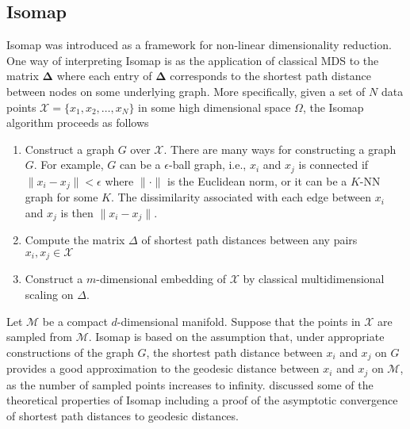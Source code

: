 \subsection{Isomap}
\label{sec:isomap}
Isomap \citep{tenebaum00:_global_geomet_framew_nonlin_dimen_reduc} was
introduced as a framework for non-linear dimensionality reduction. One
way of interpreting Isomap is as the application of classical MDS to
the matrix $\bm{\Delta}$ where each entry of $\bm{\Delta}$ corresponds
to the shortest path distance between nodes on some underlying
graph. More specifically, given a set of $N$ data points $\mathcal{X}
= \{x_1, x_2, \dots, x_N\}$ in some high dimensional space $\Omega$,
the Isomap algorithm proceeds as follows
\begin{enumerate}
\item Construct a graph $G$ over $\mathcal{X}$. There are many ways
  for constructing a graph $G$. For example, $G$ can be a
  $\epsilon$-ball graph, i.e., $x_i$ and $x_j$ is connected if $\|x_i
  - x_j\| < \epsilon$ where $\| \cdot \|$ is the Euclidean norm, or it
  can be a $K$-NN graph for some $K$. The dissimilarity associated
  with each edge between $x_i$ and $x_j$ is then $\|x_i - x_j \|$.
\item Compute the matrix $\Delta$ of shortest path distances between
  any pairs $x_i, x_j \in \mathcal{X}$
\item Construct a $m$-dimensional embedding of $\mathcal{X}$ by
  classical multidimensional scaling on $\Delta$.  
\end{enumerate}
Let $\mathcal{M}$ be a compact $d$-dimensional manifold. Suppose that
the points in $\mathcal{X}$ are sampled from $\mathcal{M}$. Isomap is
based on the assumption that, under appropriate constructions of the
graph $G$, the shortest path distance between $x_i$ and $x_j$ on $G$
provides a good approximation to the geodesic distance between $x_i$
and $x_j$ on $\mathcal{M}$, as the number of sampled points increases to
infinity. \citet{bernstein00:_graph} discussed some of the theoretical
properties of Isomap including a proof of the asymptotic convergence
of shortest path distances to geodesic distances.
%
%
